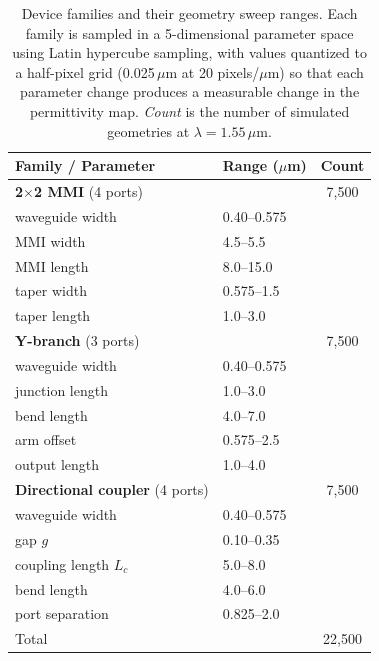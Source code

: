 \documentclass[%
 reprint,
 amsmath,amssymb,
 aps,
floatfix,
]{revtex4-2}
\begin{document}
\begin{table}[!htbp]
\centering
\caption{Device families and their geometry sweep ranges. Each family is sampled in a 5-dimensional parameter space using Latin hypercube sampling, with values quantized to a half-pixel grid (0.025\,$\mu$m at 20 pixels/$\mu$m) so that each parameter change produces a measurable change in the permittivity map. \emph{Count} is the number of simulated geometries at $\lambda=1.55\,\mu$m.}
\label{tab:devices}
\begin{ruledtabular}
\begin{tabular}{llc}
Family / Parameter & Range ($\mu$m) & Count \\
\hline
\textbf{2$\times$2 MMI} (4 ports)        &              & 7,500 \\
\quad waveguide width                    & 0.40--0.575  &       \\
\quad MMI width                          & 4.5--5.5     &       \\
\quad MMI length                         & 8.0--15.0    &       \\
\quad taper width                        & 0.575--1.5   &       \\
\quad taper length                       & 1.0--3.0     &       \\[2pt]
\textbf{Y-branch} (3 ports)              &              & 7,500 \\
\quad waveguide width                    & 0.40--0.575  &       \\
\quad junction length                    & 1.0--3.0     &       \\
\quad bend length                        & 4.0--7.0     &       \\
\quad arm offset                         & 0.575--2.5   &       \\
\quad output length                      & 1.0--4.0     &       \\[2pt]
\textbf{Directional coupler} (4 ports)   &              & 7,500 \\
\quad waveguide width                    & 0.40--0.575  &       \\
\quad gap $g$                            & 0.10--0.35   &       \\
\quad coupling length $L_c$              & 5.0--8.0     &       \\
\quad bend length                        & 4.0--6.0     &       \\
\quad port separation                    & 0.825--2.0   &       \\[2pt]
\hline
Total                                    &              & 22,500 \\
\end{tabular}
\end{ruledtabular}
\end{table}
\end{document}
